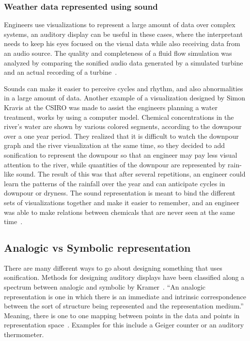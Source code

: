 \subsubsection{Weather data represented using sound} %
\label{ssub:weather_data_represented_using_sound}

Engineers use visualizations to represent a large amount of data over complex systems, an auditory display can be useful in these cases, where the interpretant needs to keep his eyes focused on the visual data while also receiving data from an audio source. 
The quality and completeness of a fluid flow simulation was analyzed by comparing the sonified audio data generated by a simulated turbine and an actual recording of a turbine~\cite*{Barrass1999}.

Sounds can make it easier to perceive cycles and rhythm, and also abnormalities in a large amount of data. 
Another example of a visualization designed by Simon Kravis at the CSIRO was made to assist the engineers planning a water treatment, works by using a computer model. 
Chemical concentrations in the river’s water are shown by various colored segments, according to the downpour over a one year period. 
They realized that it is difficult to watch the downpour graph and the river visualization at the same time, so they decided to add sonification to represent the downpour so that an engineer may pay less visual attention to the river, while quantities of the downpour are represented by rain-like sound. 
The result of this was that after several repetitions, an engineer could learn the patterns of the rainfall over the year and can anticipate cycles in downpour or dryness. 
The sound representation is meant to bind the different sets of visualizations together and make it easier to remember, and an engineer was able to make relations between chemicals that are never seen at the same time~\cite*{Barrass1998}. 




\subsection{Analogic vs Symbolic representation} %
\label{sub:analogic_vs_symbolic_representation}

There are many different ways to go about designing something that uses sonification. Methods for designing auditory displays have been classified along a spectrum between analogic and symbolic by Kramer~\cite*{Barrass1999}.
\enquote{An analogic representation is one in which there is an immediate and intrinsic correspondence between the sort of structure being represented and the representation medium.}
Meaning, there is one to one mapping between points in the data and points in representation space~\cite*{Barrass1999}. 
Examples for this include a Geiger counter or an auditory thermometer.

